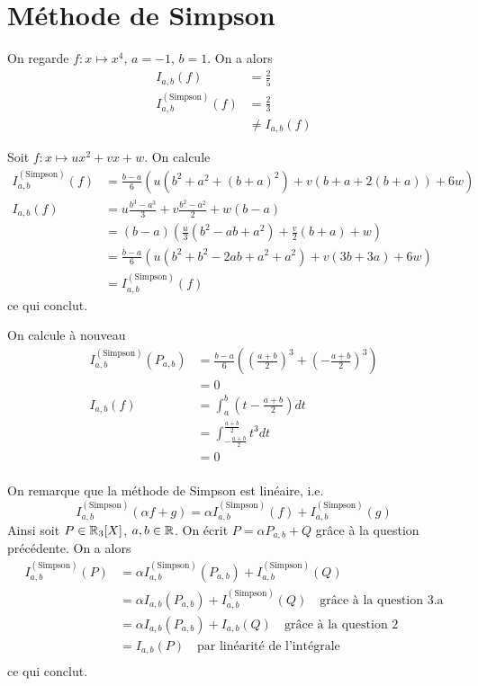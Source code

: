 
\section*{Méthode de Simpson}

\ques On regarde $ f: x \mapsto x^4 $, $ a=-1 $, $ b=1 $. On a alors 
\begin{align*}
    I_{a, b}(f) &= \frac{2}{5}\\
    I^{(\textrm{Simpson})}_{a, b}(f) &= \frac{2}{3}\\
                                     &\neq I_{a, b}(f)
\end{align*}

\ques Soit $ f : x \mapsto ux^2 + vx + w $. On calcule 
\begin{align*}
    I^{(\textrm{Simpson})}_{a, b}(f) &= \frac{b-a}{6} \left( u(b^2 + a^2 + (b+a)^2) + v(b + a + 2(b+a)) + 6w \right)\\
    I_{a, b}(f) &= u \frac{b^3 - a^3}{3} + v \frac{b^2-a^2}{2} + w(b-a)\\
                &= (b-a) \left( \frac{u}{3}(b^2 - ab + a^2) + \frac{v}{2}(b+a) + w \right)\\
                &= \frac{b-a}{6} \left( u(b^2 + b^2 - 2ab + a^2 + a^2) + v(3b+3a) + 6w \right)\\
                &= I^{(\textrm{Simpson})}_{a, b}(f)
\end{align*}
ce qui conclut.

\ques On calcule à nouveau 
\begin{align*}
    I^{(\textrm{Simpson})}_{a, b}(P_{a,b}) &= \frac{b-a}{6}((\frac{a+b}{2})^3 + (-\frac{a+b}{2})^3) \\
                                           &= 0\\
    I_{a, b}(f) &= \int_{a}^{b} (t - \frac{a+b}{2})dt\\
                &= \int_{-\frac{a+b}{2}}^{\frac{a+b}{2}} t^3dt \\
                &= 0\\
\end{align*}

\ques On remarque que la méthode de Simpson est linéaire, i.e. \[
    I^{(\textrm{Simpson})}_{a, b}(\alpha f + g) = \alpha  I^{(\textrm{Simpson})}_{a, b}(f) +  I^{(\textrm{Simpson})}_{a, b}(g)
\]
Ainsi soit $ P \in \mathbb{R}_3[X] $, $ a, b \in \mathbb{R} $. On écrit $ P = \alpha P_{a, b} + Q $ grâce à la question précédente. On a alors 
\begin{align*}
    I^{(\textrm{Simpson})}_{a, b}(P) &= \alpha  I^{(\textrm{Simpson})}_{a, b}(P_{a,b}) + I^{(\textrm{Simpson})}_{a, b}(Q) \\
                                     &= \alpha I_{a, b}(P_{a, b}) + I^{(\textrm{Simpson})}_{a, b}(Q) \quad \textrm{grâce à la question 3.a}\\
                                     &= \alpha I_{a, b}(P_{a, b}) + I_{a, b}(Q) \quad \textrm{grâce à la question 2}\\
                                     &= I_{a, b}(P) \quad \textrm{par linéarité de l'intégrale}\\
\end{align*}
ce qui conclut.

